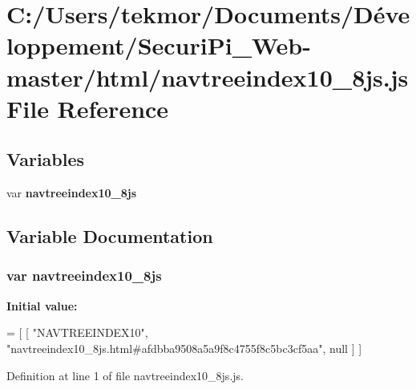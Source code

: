 \section{C\+:/\+Users/tekmor/\+Documents/\+Développement/\+Securi\+Pi\+\_\+\+Web-\/master/html/navtreeindex10\+\_\+8js.js File Reference}
\label{navtreeindex10__8js_8js}
\subsection*{Variables}
\begin{DoxyCompactItemize}
\item 
var {\bf navtreeindex10\+\_\+8js}
\end{DoxyCompactItemize}


\subsection{Variable Documentation}
\subsubsection[{navtreeindex10\+\_\+8js}]{\setlength{\rightskip}{0pt plus 5cm}var navtreeindex10\+\_\+8js}\label{navtreeindex10__8js_8js_a46bcea1da1add992dc1cd416275c93d4}
{\bfseries Initial value\+:}
\begin{DoxyCode}
=
[
    [ \textcolor{stringliteral}{"NAVTREEINDEX10"}, \textcolor{stringliteral}{"navtreeindex10\_8js.html#afdbba9508a5a9f8c4755f8c5bc3cf5aa"}, null ]
]
\end{DoxyCode}


Definition at line 1 of file navtreeindex10\+\_\+8js.\+js.

